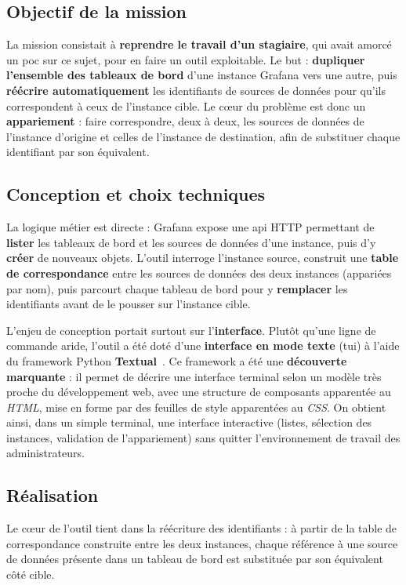 \subsection{Objectif de la mission}
La mission consistait à \textbf{reprendre le travail d'un stagiaire}, qui avait
amorcé un \gls{poc} sur ce sujet, pour en faire un outil exploitable. Le but :
\textbf{dupliquer l'ensemble des tableaux de bord} d'une instance Grafana vers une
autre, puis \textbf{réécrire automatiquement} les identifiants de sources de
données pour qu'ils correspondent à ceux de l'instance cible. Le cœur du problème
est donc un \textbf{appariement} : faire correspondre, deux à deux, les sources
de données de l'instance d'origine et celles de l'instance de destination, afin
de substituer chaque identifiant par son équivalent.

\subsection{Conception et choix techniques}
La logique métier est directe : Grafana expose une \gls{api} HTTP permettant de
\textbf{lister} les tableaux de bord et les sources de données d'une instance,
puis d'y \textbf{créer} de nouveaux objets. L'outil interroge l'instance source,
construit une \textbf{table de correspondance} entre les sources de données des
deux instances (appariées par nom), puis parcourt chaque tableau de bord pour y
\textbf{remplacer} les identifiants avant de le pousser sur l'instance cible.

L'enjeu de conception portait surtout sur l'\textbf{interface}. Plutôt qu'une
ligne de commande aride, l'outil a été doté d'une \textbf{interface en mode texte}
(\gls{tui}) à l'aide du framework Python \textbf{Textual}~\cite{textual-doc}. Ce framework a été une
\textbf{découverte marquante} : il permet de décrire une interface terminal selon
un modèle très proche du développement web, avec une structure de composants
apparentée au \emph{HTML}, mise en forme par des feuilles de style apparentées au
\emph{CSS}. On obtient ainsi, dans un simple terminal, une interface interactive
(listes, sélection des instances, validation de l'appariement) sans quitter
l'environnement de travail des administrateurs.

\subsection{Réalisation}
Le cœur de l'outil tient dans la réécriture des identifiants : à partir de la
table de correspondance construite entre les deux instances, chaque référence à
une source de données présente dans un tableau de bord est substituée par son
équivalent côté cible.


